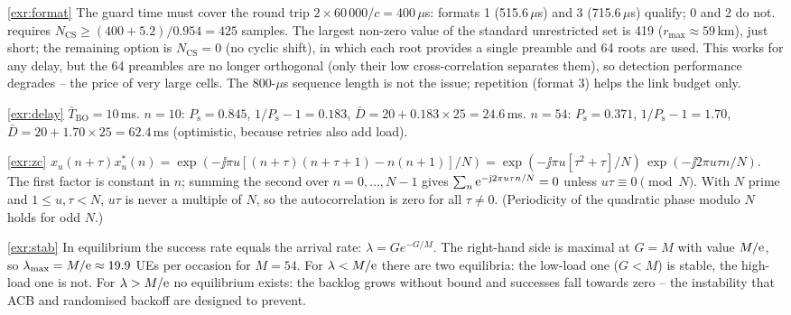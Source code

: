 \documentclass[11pt,a4paper]{article}
\begin{document}
\begin{solutionbox}{\ref{exr:format}}
The guard time must cover the round trip $2\times60\,000/c = 400\,\mu$s: formats 1 (515.6\,$\mu$s) and 3
(715.6\,$\mu$s) qualify; 0 and 2 do not.  requires $N_{\mathrm{CS}} \ge (400+5.2)/0.954 = 425$
samples. The largest non-zero value of the standard unrestricted set is 419 ($r_{\max}\approx59$\,km), just
short; the remaining option is $N_{\mathrm{CS}} = 0$ (no cyclic shift), in which each root provides a single
preamble and 64 roots are used. This works for any delay, but the 64 preambles are no longer orthogonal (only
their low cross-correlation separates them), so detection performance degrades -- the price of very large
cells. The 800-$\mu$s sequence length is not the issue; repetition (format 3) helps the link budget only.
\end{solutionbox}

\begin{solutionbox}{\ref{exr:delay}}
$\bar T_{\mathrm{BO}} = 10$\,ms. $n=10$: $P_\mathrm{s} = 0.845$, $1/P_\mathrm{s}-1 = 0.183$, $\bar D = 20 + 0.183\times25 =
24.6$\,ms. $n=54$: $P_\mathrm{s} = 0.371$, $1/P_\mathrm{s}-1 = 1.70$, $\bar D = 20 + 1.70\times25 = 62.4$\,ms
(optimistic, because retries also add load).
\end{solutionbox}

\begin{solutionbox}{\ref{exr:zc}}
$x_u(n+\tau)x_u^\ast(n) = \exp(-\jj\pi u[(n+\tau)(n+\tau+1) - n(n+1)]/N) =
\exp(-\jj\pi u[\tau^2+\tau]/N)\,\exp(-\jj 2\pi u\tau n/N)$. The first factor is constant in $n$; summing the
second over $n = 0,\dots,N-1$ gives $\sum_n \mathrm{e}^{-\mathrm{j}2\pi u\tau n/N} = 0$ unless $u\tau \equiv 0 \pmod N$. With
$N$ prime and $1\le u,\tau<N$, $u\tau$ is never a multiple of $N$, so the autocorrelation is zero for all
$\tau\neq0$. (Periodicity of the quadratic phase modulo $N$ holds for odd $N$.)
\end{solutionbox}

\begin{solutionbox}{\ref{exr:stab}}
In equilibrium the success rate equals the arrival rate: $\lambda = G e^{-G/M}$. The right-hand side is
maximal at $G = M$ with value $M/\mathrm{e}$, so $\lambda_{\max} = M/\mathrm{e} \approx 19.9$ UEs per occasion for $M=54$. For
$\lambda < M/\mathrm{e}$ there are two equilibria: the low-load one ($G<M$) is stable, the high-load one is not. For
$\lambda > M/\mathrm{e}$ no equilibrium exists: the backlog grows without bound and successes fall towards zero --
the instability that ACB and randomised backoff are designed to prevent.
\end{solutionbox}
\end{document}

